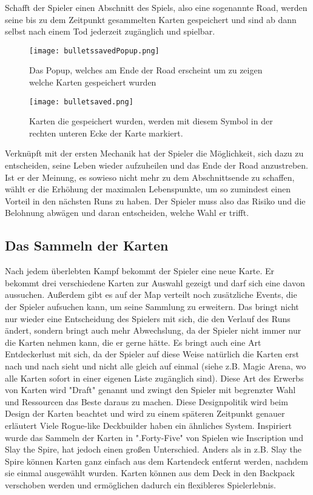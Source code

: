 Schafft der Spieler einen Abschnitt des Spiels, also eine sogenannte Road, werden seine bis zu dem Zeitpunkt gesammelten Karten
gespeichert und sind ab dann selbst nach einem Tod jederzeit zugänglich und spielbar.

\begin{figure}[H]
    \texttt{[image: bulletssavedPopup.png]}
    \caption{Das Popup, welches am Ende der Road erscheint um zu zeigen welche Karten gespeichert wurden}
\end{figure}


\begin{figure}[H]
    \texttt{[image: bulletsaved.png]}
    \caption{Karten die gespeichert wurden, werden mit diesem Symbol in der rechten unteren Ecke der Karte markiert.}
\end{figure}

Verknüpft mit der ersten Mechanik
hat der Spieler die Möglichkeit, sich dazu zu entscheiden, seine Leben wieder aufzuheilen und das Ende der Road anzustreben.
Ist er der Meinung, es sowieso nicht mehr zu dem Abschnittsende zu schaffen, wählt er die Erhöhung der maximalen
Lebenspunkte, um so zumindest einen Vorteil in den nächsten Runs zu haben. Der Spieler muss also das Risiko und die
Belohnung abwägen und daran entscheiden, welche Wahl er trifft.



\subsection{Das Sammeln der Karten}\label{sammeln_der_Karten}

Nach jedem überlebten Kampf bekommt der Spieler eine neue Karte. Er bekommt drei verschiedene Karten zur Auswahl gezeigt und darf sich eine davon aussuchen.
Außerdem gibt es auf der Map verteilt noch zusätzliche Events, die der Spieler aufsuchen kann, um seine Sammlung zu erweitern.
Das bringt nicht nur wieder eine Entscheidung des Spielers mit sich, die den Verlauf des Runs ändert, sondern bringt auch mehr Abwechslung,
da der Spieler nicht immer nur die Karten nehmen kann, die er gerne hätte. Es bringt auch eine Art Entdeckerlust mit sich, da der Spieler
auf diese Weise natürlich die Karten erst nach und nach sieht und nicht alle gleich auf einmal (siehe z.B. Magic Arena, wo alle Karten sofort in einer eigenen Liste zugänglich sind). %
Diese Art des Erwerbs von Karten wird "Draft" genannt %
und zwingt den Spieler mit begrenzter Wahl und Ressourcen das Beste daraus zu machen. Diese Designpolitik wird beim Design der Karten beachtet und wird zu einem späteren Zeitpunkt genauer erläutert %
Viele Rogue-like Deckbuilder haben ein ähnliches System. Inspiriert wurde das Sammeln der Karten in ".Forty-Five" von Spielen wie Inscription und Slay the Spire, %
hat jedoch einen großen Unterschied. Anders als in z.B. Slay the Spire können Karten ganz einfach aus dem Kartendeck entfernt werden, nachdem sie einmal ausgewählt wurden.
Karten können aus dem Deck in den Backpack verschoben werden und ermöglichen dadurch ein flexibleres Spielerlebnis. %


